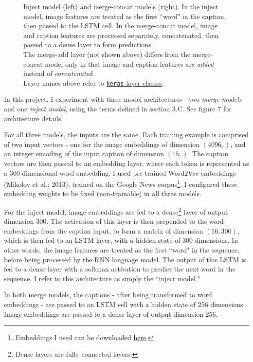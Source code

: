 \documentclass[letterpaper, 10 pt, conference]{ieeeconf}
\begin{document}
\begin{figure}[h]
\begin{minipage}{.5\textwidth}
  \label{fig:test2}
\end{minipage}
\caption{Inject model (left) and merge-concat models (right). In the inject model, image features are treated as the first ``word" in the caption, then passed to the LSTM cell. In the merge-concat model, image and caption features are processed separately, concatenated, then passed to a dense layer to form predictions. \\
The merge-add layer (not shown above) differs from the merge-concat model only in that image and caption features are \textit{added} instead of \textit{concatenated}. \\
Layer names above refer to \href{https://keras.io/layers/about-keras-layers/}{\texttt{keras} layer classes}.}
\end{figure}

In this project, I experiment with three model architectures - two \textit{merge models} and one \textit{inject model}, using the terms defined in section 3.C. See figure 7 for architecture details.

For all three models, the inputs are the same. Each training example is comprised of two input vectors - one for the image embeddings of dimension $(4096,)$, and an integer encoding of the input caption of dimension $(15,)$. The caption vectors are then passed to an embedding layer, where each token is represented as a 300 dimensional word embedding. I used pre-trained Word2Vec embeddings (Mikolov et al.; 2013), trained on the Google News corpus\footnote{Embeddings I used can be downloaded \href{https://github.com/mmihaltz/word2vec-GoogleNews-vectors}{here}.}. I configured these embedding weights to be fixed (non-trainable) in all three models. 

For the inject model, image embeddings are fed to a dense\footnote{Dense layers are fully connected layers.} layer of output dimension 300. The activation of this layer is then prepended to the word embeddings from the caption input, to form a matrix of dimension $(16,300)$, which is then fed to an LSTM layer, with a hidden state of 300 dimensions. In other words, the image features are treated as the first ``word" in the sequence, before being processed by the RNN language model. The output of this LSTM is fed to a dense layer with a softmax activation to predict the next word in the sequence. I refer to this architecture as simply the ``inject model."

In both merge models, the captions - after being transformed to word embeddings - are passed to an LSTM cell  with a hidden state of 256 dimensions. Image embeddings are passed to a dense layer of output dimension 256. 
\end{document}
